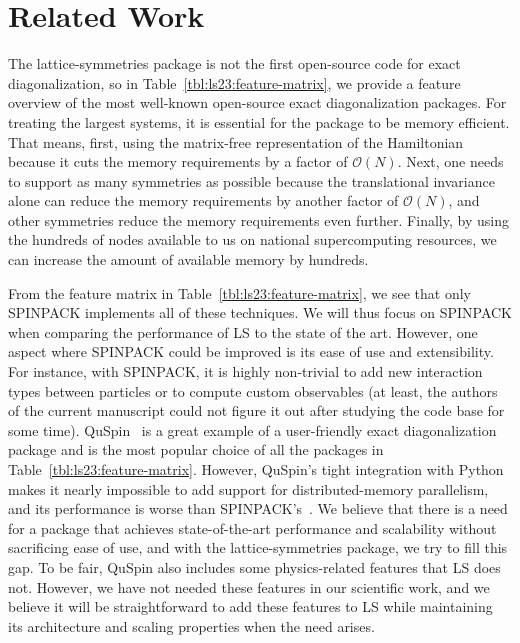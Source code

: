\section{Related Work}\label{sec:ls23:related-work}

The lattice-symmetries package is not the first open-source code for exact diagonalization, so in Table~\ref{tbl:ls23:feature-matrix}, we provide a feature overview of the most well-known open-source exact diagonalization packages. For treating the largest systems, it is essential for the package to be memory efficient. That means, first, using the matrix-free representation of the Hamiltonian because it cuts the memory requirements by a factor of $\mathcal{O}(N)$. Next, one needs to support as many symmetries as possible because the translational invariance alone can reduce the memory requirements by another factor of $\mathcal{O}(N)$, and other symmetries reduce the memory requirements even further. Finally, by using the hundreds of nodes available to us on national supercomputing resources, we can increase the amount of available memory by hundreds.

From the feature matrix in Table~\ref{tbl:ls23:feature-matrix}, we see that only SPINPACK implements all of these techniques. We will thus focus on SPINPACK when comparing the performance of LS to the state of the art. However, one aspect where SPINPACK could be improved is its ease of use and extensibility. For instance, with SPINPACK, it is highly non-trivial to add new interaction types between particles or to compute custom observables (at least, the authors of the current manuscript could not figure it out after studying the code base for some time). QuSpin~\cite{Weinbe2017QuspinAPytho,Weinbe2019QuspinAPytho} is a great example of a user-friendly exact diagonalization package and is the most popular choice of all the packages in Table~\ref{tbl:ls23:feature-matrix}. However, QuSpin's tight integration with Python makes it nearly impossible to add support for distributed-memory parallelism, and its performance is worse than SPINPACK's~\cite{Westerhout2021latti}. We believe that there is a need for a package that achieves state-of-the-art performance and scalability without sacrificing ease of use, and with the lattice-symmetries package, we try to fill this gap. To be fair, QuSpin also includes some physics-related features that LS does not. However, we have not needed these features in our scientific work, and we believe it will be straightforward to add these features to LS while maintaining its architecture and scaling properties when the need arises.%

